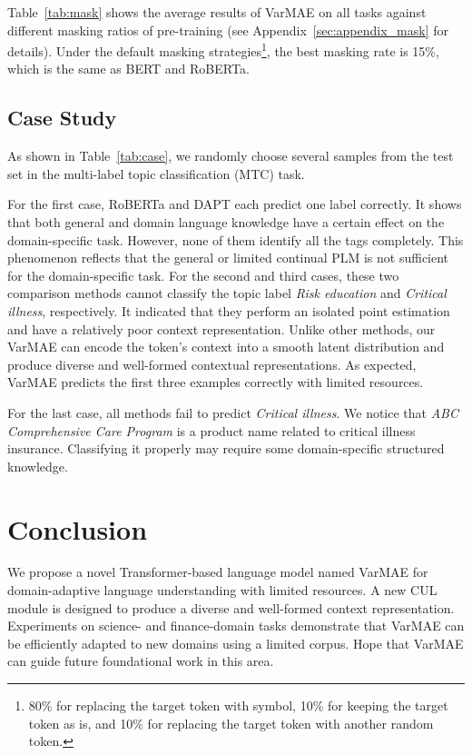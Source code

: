 \documentclass[11pt]{article}
\begin{document}
Table~\ref{tab:mask} shows the average results of VarMAE on all tasks against different masking ratios of pre-training {(see Appendix~\ref{sec:appendix_mask} for details)}. 
Under the default masking strategies\footnote{{
80\% for replacing the target token with  symbol, 10\% for keeping the target token as is, and 10\% for replacing the target token with another random token.}}, 
the best masking rate is 15\%, which is the same as BERT and RoBERTa.



\subsection{Case Study}
As shown in Table~\ref{tab:case}, we randomly choose several samples from the test set in the multi-label topic classification (MTC) task. 

For the first {case}, RoBERTa and DAPT each predict one label correctly. 
It shows that both general and domain language knowledge have a certain effect on the domain-specific task.
However, none of them identify all the tags completely.
This phenomenon reflects that the general or limited continual PLM is not sufficient for the domain-specific task.
For the second and third {cases}, these two comparison methods cannot classify the topic label \textit{Risk education} and \textit{Critical illness}, respectively.
It indicated that they perform an isolated point estimation and have a relatively poor context representation.
Unlike other methods, our VarMAE can encode the token's context into a smooth latent distribution and produce diverse and well-formed contextual representations.
As expected, VarMAE predicts the first three examples correctly with limited resources.

For the last case, all methods fail to predict \textit{Critical illness}. 
We notice that \textit{ABC Comprehensive Care Program} is a product name related to critical illness insurance. Classifying it properly may require some domain-specific structured knowledge. 

\section{Conclusion}

We propose a novel Transformer-based language model named VarMAE for domain-adaptive language understanding with limited resources. A new CUL module is designed to produce a diverse and well-formed context representation. Experiments on science- and finance-domain tasks demonstrate that VarMAE can be efficiently adapted to new domains using a limited corpus. 
Hope that VarMAE can guide future foundational work in this area. 
\end{document}
